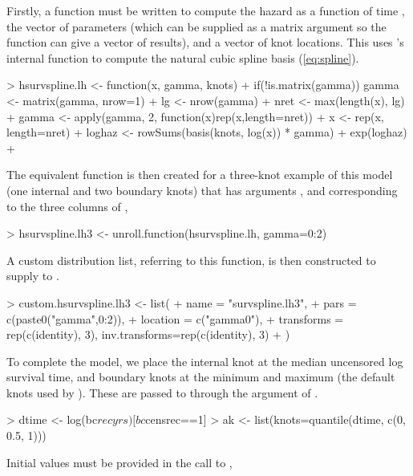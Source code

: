 \documentclass[nojss,nofooter]{jss}
\begin{document}
Firstly, a function must be written to compute the hazard as a
function of time , the vector of parameters 
(which can be supplied as a matrix argument so the function can give a
vector of results), and a vector of knot locations.  This uses 's internal 
function  to compute the natural cubic spline basis (\ref{eq:spline}).
\begin{Schunk}
\begin{Sinput}
> hsurvspline.lh <- function(x, gamma, knots){
+     if(!is.matrix(gamma)) gamma <- matrix(gamma, nrow=1)
+     lg <- nrow(gamma)
+     nret <- max(length(x), lg)
+     gamma <- apply(gamma, 2, function(x)rep(x,length=nret))
+     x <- rep(x, length=nret)
+     loghaz <- rowSums(basis(knots, log(x)) * gamma)
+     exp(loghaz)
+ }
\end{Sinput}
\end{Schunk}
The equivalent function is then created for a three-knot example of
this model (one internal and two boundary knots) that has arguments
,  and  corresponding to the
three columns of ,
\begin{Schunk}
\begin{Sinput}
> hsurvspline.lh3 <- unroll.function(hsurvspline.lh, gamma=0:2)
\end{Sinput}
\end{Schunk}
A custom distribution list, referring to this function, is then
constructed to supply to .
\begin{Schunk}
\begin{Sinput}
> custom.hsurvspline.lh3 <- list(
+     name = "survspline.lh3",
+     pars = c(paste0("gamma",0:2)),
+     location = c("gamma0"),
+     transforms = rep(c(identity), 3), inv.transforms=rep(c(identity), 3)
+     )
\end{Sinput}
\end{Schunk}
To complete the model, we place the internal knot at the median uncensored log survival time,
and boundary knots at the minimum and maximum (the default knots used by ). 
These are passed to  through the  argument of .
\begin{Schunk}
\begin{Sinput}
> dtime <- log(bc$recyrs)[bc$censrec==1]
> ak <- list(knots=quantile(dtime, c(0, 0.5, 1)))
\end{Sinput}
\end{Schunk}
Initial values must be provided in the call to ,
\end{document}
